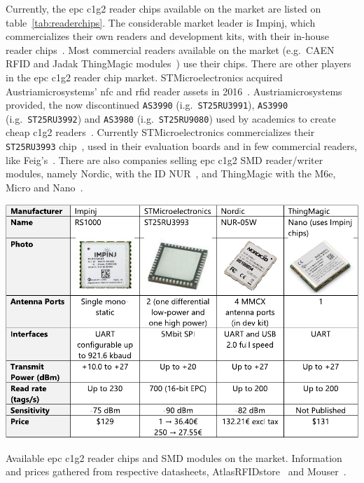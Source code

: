 Currently, the \ac{epc} \ac{c1g2} reader chips available on the market are listed on table~\ref{tab:readerchips}.
The considerable market leader is Impinj, which commercializes their own readers and development kits, with their in-house reader chips~\cite{RAINRFIDReader}. Most commercial readers available on the market (e.g.\ CAEN RFID and Jadak ThingMagic modules~\cite{RAINRFIDPartner}) use their chips.
There are other players in the \ac{epc} \ac{c1g2} reader chip market. 
STMicroelectronics acquired Austriamicrosystems' \ac{nfc} and \ac{rfid} reader assets in 2016~\cite{PressRelease}. Austriamicrosystems provided, the now discontinued \texttt{AS3990} (i.g.\ \texttt{ST25RU3991}), \texttt{AS3990} (i.g.\ \texttt{ST25RU3992}) and \texttt{AS3980} (i.g.\ \texttt{ST25RU9080}) used by academics to create cheap \ac{c1g2} readers~\cite{tangDesignUHFRFID2010a, leiDesignHandheldUHF2011, liDesignRadioFrequency2011}. Currently STMicroelectronics
commercializes their \texttt{ST25RU3993} chip~\cite{ST25RU3993}, used in their evaluation boards and in few commercial readers, like Feig's~\cite{UHFMidRange}.
There are also companies selling \ac{epc} \ac{c1g2} SMD reader/writer modules, namely Nordic, with the ID NUR~\cite{NURModulesNordic}, and ThingMagic with the M6e, Micro and Nano~\cite{ThingMagicRFID}.

\begin{table}
    \centering
    \includegraphics[width=\linewidth]{./figs/02-state-of-the-art/table_chipreaders.pdf}
    \caption[Available \ac{epc} \acs{c1g2} reader chips and SMD modules on the market]{Available \ac{epc} \acs{c1g2} reader chips and SMD modules on the market. Information and prices gathered from respective datasheets, AtlasRFIDstore~\cite{AtlasRFIDstoreBuyRFID} and Mouser~\cite{DistribuidorComponentesEletronicos}.}
    \label{tab:readerchips}
\end{table}


